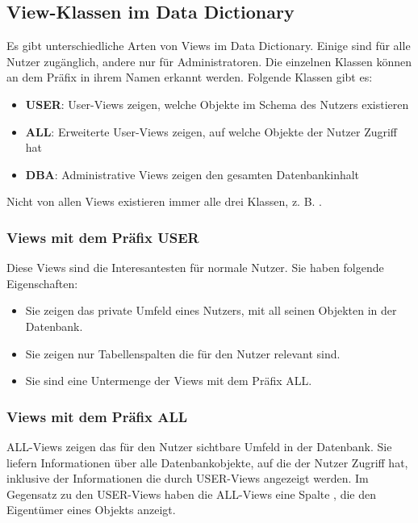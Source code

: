       \subsection{View-Klassen im Data Dictionary}
        Es gibt unterschiedliche Arten von Views im Data Dictionary. Einige sind f\"ur alle Nutzer zug\"anglich, andere nur f\"ur Administratoren. Die einzelnen Klassen k\"onnen an dem Pr\"afix in ihrem Namen erkannt werden. Folgende Klassen gibt es:
        \begin{itemize}
          \item \textbf{USER}: User-Views zeigen, welche Objekte im Schema des Nutzers existieren
          \item \textbf{ALL}: Erweiterte User-Views zeigen, auf welche Objekte der Nutzer Zugriff hat
          \item \textbf{DBA}: Administrative Views zeigen den gesamten Datenbankinhalt
        \end{itemize}
        \begin{merke}
          Nicht von allen Views existieren immer alle drei Klassen, z. B. .
        \end{merke}
        \subsubsection{Views mit dem Pr\"afix USER}
          Diese Views sind die Interesantesten f\"ur normale Nutzer. Sie haben folgende Eigenschaften:
          \begin{itemize}
            \item Sie zeigen das private Umfeld eines Nutzers, mit all seinen Objekten in der Datenbank.
            \item Sie zeigen nur Tabellenspalten die f\"ur den Nutzer relevant sind.
            \item Sie sind eine Untermenge der Views mit dem Pr\"afix ALL.
					\end{itemize}
\clearpage
					\subsubsection{Views mit dem Pr\"afix ALL}
          ALL-Views zeigen das f\"ur den Nutzer sichtbare Umfeld in der Datenbank. Sie liefern Informationen \"uber alle Datenbankobjekte, auf die der Nutzer Zugriff hat, inklusive der Informationen die durch USER-Views angezeigt werden. Im Gegensatz zu den USER-Views haben die ALL-Views eine Spalte , die den Eigent\"umer eines Objekts anzeigt.

